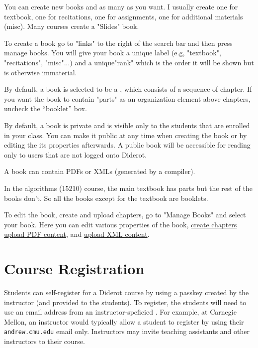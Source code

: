 \begin{gram}
You can create new books and as many as you want.  I usually create one for textbook, one for recitations, one for assignments, one for additional materials (misc).  Many courses create a "Slides" book.  

To create a book go to "links" to the right of the search bar and then press
manage books.  You will give your book a unique label (e.g,
"textbook", "recitations", "misc"...) and a unique"rank" which is the
order it will be shown but is otherwise immaterial.  

By default, a book is selected to be a , which
consists of a sequence of chapter.  
%
If you want the book to contain "parts" as an organization element
above chapters, uncheck the ``booklet'' box.  

By default, a book is private and is visible only to the students that are enrolled in your class.  
%
You can make it public at any time when creating the book or by editing the its properties afterwards.  
%
A public book will be accessible for reading only to users that are not logged onto Diderot.


A book can contain PDFs or XMLs (generated by a compiler).
\end{gram}

\begin{example}
In the algorithms (15210) course, the main textbook has parts but
the rest of the books don't.  So all the books except for the textbook are booklets.
\end{example}


\begin{gram}
To edit the book, create and upload chapters, go to "Manage Books" and select your book.  Here you can edit various properties of the book, 
%
\href{guide:chapter::create}{create chapters}
%
\href{guide:chapter::upload-pdf}{upload PDF content}, and
\href{guide:chapter::upload-xml}{upload XML content}.
\end{gram}


\section{Course Registration} 

Students can self-register for a Diderot course by using a  passkey created by the instructor (and provided to the students).  
%
To register, the students will need to use an email address from an instructor-speficied  .
%
For example, at Carnegie Mellon, an instructor would typically allow a student to register by using their  \lstinline`andrew.cmu.edu` email only.
%
Instructors may invite teaching assistants and other instructors to their course.

